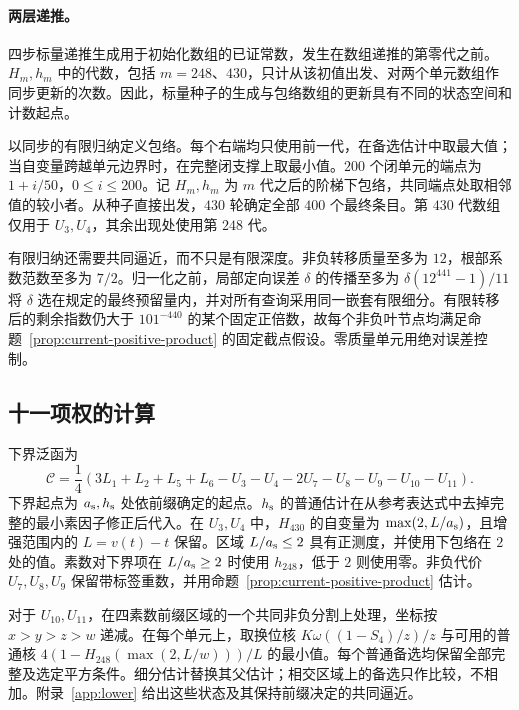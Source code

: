 \paragraph{两层递推。}
四步标量递推生成用于初始化数组的已证常数，发生在数组递推的第零代之前。$H_m,h_m$ 中的代数，包括 $m=248$、$430$，只计从该初值出发、对两个单元数组作同步更新的次数。因此，标量种子的生成与包络数组的更新具有不同的状态空间和计数起点。

以同步的有限归纳定义包络。每个右端均只使用前一代，在备选估计中取最大值；当自变量跨越单元边界时，在完整闭支撑上取最小值。$200$ 个闭单元的端点为 $1+i/50$，$0\le i\le200$。记 $H_m,h_m$ 为 $m$ 代之后的阶梯下包络，共同端点处取相邻值的较小者。从种子直接出发，$430$ 轮确定全部 $400$ 个最终条目。第 $430$ 代数组仅用于 $U_3,U_4$，其余出现处使用第 $248$ 代。

有限归纳还需要共同逼近，而不只是有限深度。非负转移质量至多为 $12$，根部系数范数至多为 $7/2$。归一化之前，局部定向误差 $\delta$ 的传播至多为
$\delta(12^{441}-1)/11$
将 $\delta$ 选在规定的最终预留量内，并对所有查询采用同一嵌套有限细分。有限转移后的剩余指数仍大于 $101^{-440}$ 的某个固定正倍数，故每个非负叶节点均满足命题~\ref{prop:current-positive-product} 的固定截点假设。零质量单元用绝对误差控制。

\subsection{十一项权的计算}

下界泛函为
\begin{equation}
 \mathcal C=\frac14
   (3L_1+L_2+L_5+L_6-U_3-U_4-2U_7-U_8-U_9-U_{10}-U_{11}).
 \label{eq:current-root-functional}
\end{equation}
下界起点为 ${a_{\rm s}},{h_{\rm s}}$ 处依前缀确定的起点。${h_{\rm s}}$ 的普通估计在从参考表达式中去掉完整的最小素因子修正后代入。在 $U_3,U_4$ 中，$H_{430}$ 的自变量为 $\max(2,L/{a_{\rm s}})$，且增强范围内的 $L=v(t)-t$ 保留。区域 $L/{a_{\rm s}}\le2$ 具有正测度，并使用下包络在 $2$ 处的值。素数对下界项在 $L/{a_{\rm s}}\ge2$ 时使用 $h_{248}$，低于 $2$ 则使用零。非负代价 $U_7,U_8,U_9$ 保留带标签重数，并用命题~\ref{prop:current-positive-product} 估计。

对于 $U_{10},U_{11}$，在四素数前缀区域的一个共同非负分割上处理，坐标按 $x>y>z>w$ 递减。在每个单元上，取换位核 $K\omega((1-S_4)/z)/z$ 与可用的普通核 $4(1-H_{248}(\max(2,L/w)))/L$ 的最小值。每个普通备选均保留全部完整及选定平方条件。细分估计替换其父估计；相交区域上的备选只作比较，不相加。附录~\ref{app:lower} 给出这些状态及其保持前缀决定的共同逼近。

